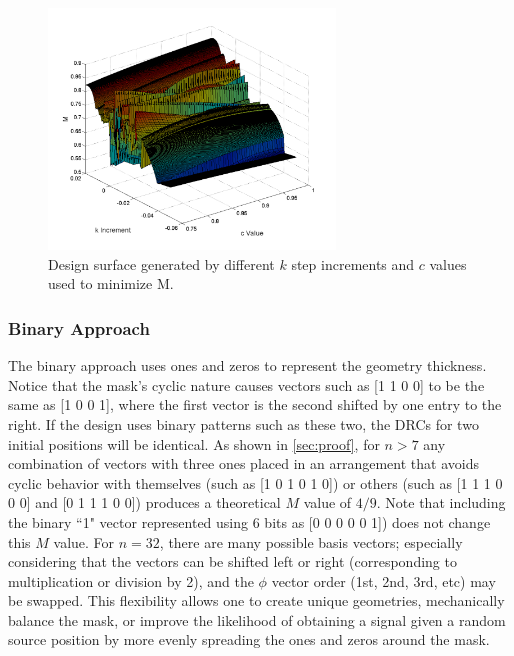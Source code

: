 \documentclass[3p,times]{elsarticle}
\begin{document}
\begin{figure}[ht!]
\includegraphics[width={3.0in}]{../figs/Eigprob32bitCouple2W1.pdf}
\centering
\caption{Design surface generated by different $k$ step increments and $c$ values used to minimize M.}
\label{fig:surf}
\end{figure}

\subsubsection{Binary Approach} \label{sec:binary}
The binary approach uses ones and zeros to represent the geometry thickness.  
Notice that the mask's cyclic nature causes vectors such as [1 1 0 0] to be the same as [1 0 0 1], where the first vector is the second shifted by one entry to the right.  
If the design uses binary patterns such as these two, the DRCs for two initial positions will be identical.  
As shown in \ref{sec:proof}, for $n>7$ any combination of vectors with three ones placed in an arrangement that avoids cyclic behavior with themselves (such as [1 0 1 0 1 0]) or others (such as [1 1 1 0 0 0] and [0 1 1 1 0 0]) produces a theoretical $M$ value of $4/9$.  
Note that including the binary ``1" vector represented using 6 bits as [0 0 0 0 0 1]) does not change this $M$ value.   
For $n=32$, there are many possible basis vectors; especially considering that the vectors can be shifted left or right (corresponding to multiplication or division by 2), and the $\phi$ vector order (1st, 2nd, 3rd, etc) may be swapped.  
This flexibility allows one to create unique geometries, mechanically balance the mask, or improve the likelihood of obtaining a signal given a random source position by more evenly spreading the ones and zeros around the mask.
\end{document}

